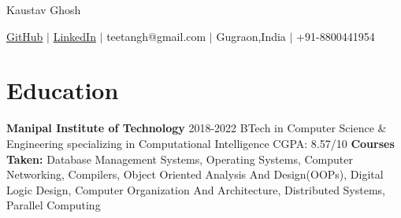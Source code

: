 \documentclass{article}
\begin{document}
\thispagestyle{empty}  %




\begin{center}
    \huge{Kaustav Ghosh} %

    \normalsize{
        \textmd{
            \href{https://www.github.com/teetangh}{GitHub} \(|\)
            \href{https://www.linkedin.com/in/kaustav-ghosh-1538651bb/}{LinkedIn} \(|\)
            teetangh@gmail.com \(|\)
            Gugraon,India \(|\)
            +91-8800441954
        }}
\end{center}


\section*{Education}

\textbf{Manipal Institute of Technology} \hfill \textmd{2018-2022}
\textmd{\newline \textmd{BTech in Computer Science \& Engineering specializing in Computational Intelligence}}
\hfill \textmd{CGPA: 8.57/10}
\newline
\textmd{\textbf{Courses Taken:} Database Management Systems, Operating Systems, Computer Networking, Compilers, Object Oriented Analysis And Design(OOPs), Digital Logic Design, Computer Organization And Architecture, Distributed Systems, Parallel Computing}

\end{document}

